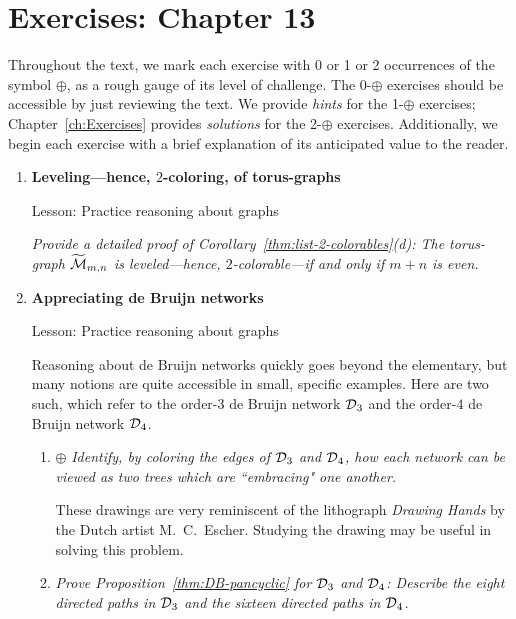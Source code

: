 
\section{Exercises: Chapter 13}

Throughout the text, we mark each exercise with 0 or 1 or 2 occurrences of the symbol $\oplus$, as a rough gauge of its level of challenge.  The 0-$\oplus$ exercises should be accessible by just reviewing the text.  We provide {\em hints} for the 1-$\oplus$ exercises; Chapter~\ref{ch:Exercises} provides {\em solutions} for the 2-$\oplus$ exercises.  Additionally, we begin each exercise with a brief explanation of its anticipated value to the reader.
 

\begin{enumerate}
\item
{\bf Leveling---hence, $2$-coloring, of torus-graphs}

{\sc Lesson:} Practice reasoning about graphs

\smallskip

{\em Provide a detailed proof of Corollary~\ref{thm:list-2-colorables}(d):  The torus-graph $\widetilde{\mbox{$\cal M$}}_{m,n}$ is leveled---hence, $2$-colorable---if and only if $m+n$ is even.}

\medskip\item
{\bf Appreciating de Bruijn networks}

{\sc Lesson:} Practice reasoning about graphs

\smallskip

Reasoning about de Bruijn networks quickly goes beyond the elementary, but many notions are quite accessible in small, specific examples.  Here are two such, which refer to the order-$3$ de Bruijn network $\mbox{$\cal D$}_3$ and the order-$4$ de Bruijn network $\mbox{$\cal D$}_4$.

  \begin{enumerate}
  \item
$\oplus$
{\em Identify, by coloring the edges of $\mbox{$\cal D$}_3$ and $\mbox{$\cal D$}_4$, how each network can be viewed as two trees which are ``embracing" one another.}

\smallskip

These drawings are very reminiscent of the lithograph {\it Drawing Hands} by the Dutch artist M.~C.~Escher.  Studying the drawing may be useful in solving this problem.

  \medskip\item 
{\em Prove Proposition~\ref{thm:DB-pancyclic} for $\mbox{$\cal D$}_3$ and $\mbox{$\cal D$}_4$: Describe the eight directed paths in $\mbox{$\cal D$}_3$ and the sixteen directed paths in $\mbox{$\cal D$}_4$.}
  \end{enumerate}


\end{enumerate}
